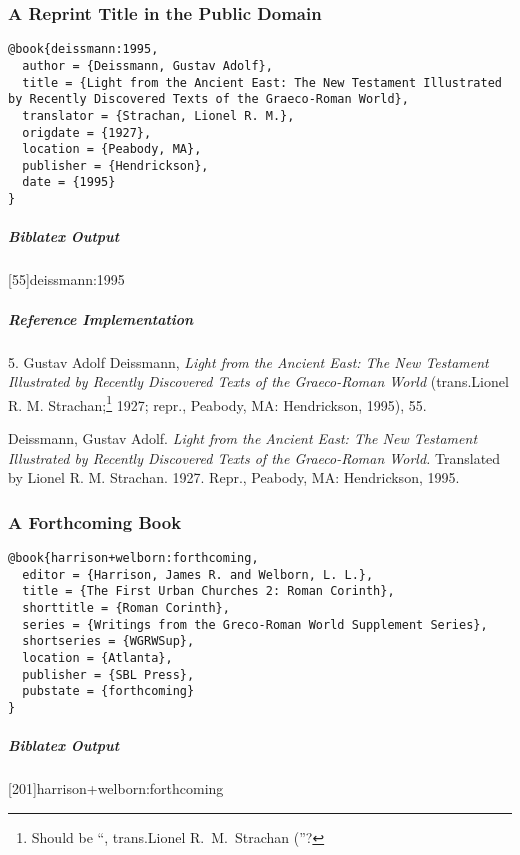 \documentclass[a4paper]{article}
\newenvironment{biboutput}{%
  \subparagraph{Biblatex Output}
}{\color{black}}
\newenvironment{refimp}{%
  \subparagraph{Reference Implementation}
  \color{reference-colour}
  \rm
}{\par\color{black}}
\begin{document}
\subsubsection{A Reprint Title in the Public Domain}

\begin{lstlisting}
@book{deissmann:1995,
  author = {Deissmann, Gustav Adolf},
  title = {Light from the Ancient East: The New Testament Illustrated by Recently Discovered Texts of the Graeco-Roman World},
  translator = {Strachan, Lionel R. M.},
  origdate = {1927},
  location = {Peabody, MA},
  publisher = {Hendrickson},
  date = {1995}
}
\end{lstlisting}  

\begin{biboutput}
  [55]{deissmann:1995}
\end{biboutput}

\begin{refimp}
  \hspace*{\bibindent}5. Gustav Adolf Deissmann, \emph{Light from the Ancient
  East: The New Testament Illustrated by Recently Discovered Texts of the
  Graeco-Roman World} (trans.\@ Lionel R. M. Strachan;\footnote{Should be “,
  trans.\@ Lionel R.\ M.\ Strachan (”?} 1927; repr., Peabody, MA: Hendrickson,
  1995), 55.

  \hangindent\bibindent Deissmann, Gustav Adolf. \emph{Light from the Ancient
  East: The New Testament Illustrated by Recently Discovered Texts of the
  Graeco-Roman World.} Translated by Lionel R. M. Strachan. 1927. Repr., Peabody,
  MA: Hendrickson, 1995.
\end{refimp}

\subsubsection{A Forthcoming Book}

\begin{lstlisting}
@book{harrison+welborn:forthcoming,
  editor = {Harrison, James R. and Welborn, L. L.},
  title = {The First Urban Churches 2: Roman Corinth},
  shorttitle = {Roman Corinth},
  series = {Writings from the Greco-Roman World Supplement Series},
  shortseries = {WGRWSup},
  location = {Atlanta},
  publisher = {SBL Press},
  pubstate = {forthcoming}
}
\end{lstlisting}

\begin{biboutput}
  [201]{harrison+welborn:forthcoming}
\end{biboutput}
\end{document}
